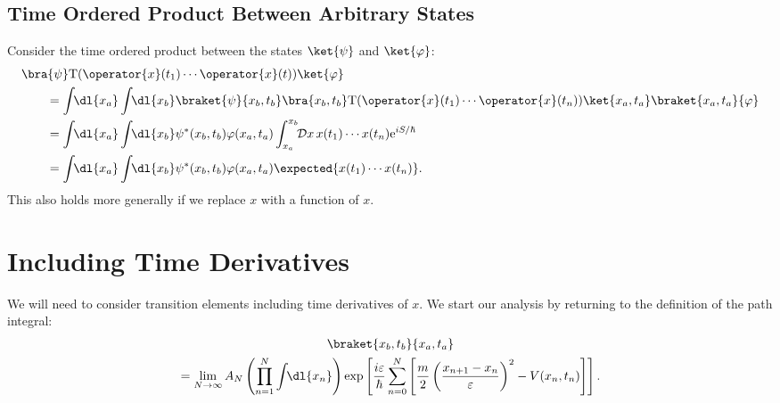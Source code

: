 \documentclass[fleqn]{NotesClass}
\newcommand*{\e}{\mathrm{e}}
\newcommand*{\timeorder}{\mathrm{T}}
\begin{document}
    \subsection{Time Ordered Product Between Arbitrary States}
    Consider the time ordered product between the states \(\ket{\psi}\) and \(\ket{\varphi}\):
    \begin{align}
        &\bra{\psi} \timeorder (\operator{x}(t_1) \dotsm \operator{x}(t)) \ket{\varphi}\\
        &\qquad= \int \!\! \dl{x_a} \int \!\! \dl{x_b} \braket{\psi}{x_b, t_b}\bra{x_b, t_b} \timeorder (\operator{x}(t_1) \dotsm \operator{x}(t_n)) \ket{x_a, t_a} \braket{x_a, t_a}{\varphi}\notag\\
        &\qquad= \int \!\! \dl{x_a} \int \!\! \dl{x_b} \psi^*(x_b, t_b) \varphi(x_a, t_a) \int_{x_a}^{x_b} \!\! \DL{x} \, x(t_1) \dotsm x(t_n) \e^{iS/\hbar}\\
        &\qquad= \int \!\! \dl{x_a} \int \!\! \dl{x_b} \psi^*(x_b, t_b) \varphi(x_a, t_a) \expected{x(t_1) \dotsm x(t_n)}.
    \end{align}
    This also holds more generally if we replace \(x\) with a function of \(x\).
    
    \section{Including Time Derivatives}
    We will need to consider transition elements including time derivatives of \(x\).
    We start our analysis by returning to the definition of the path integral:
    \begin{multline}\label{eqn:definition of path integral}
        \braket{x_b, t_b}{x_a, t_a}\\
        = \lim_{N\to\infty} A_N \left( \prod_{n=1}^{N} \int\!\!\dl{x_n} \right) \exp\left[ \frac{i\varepsilon}{\hbar} \sum_{n=0}^{N} \left[ \frac{m}{2}\left( \frac{x_{n+1} - x_n}{\varepsilon} \right)^2 - V(x_n, t_n) \right] \right].
    \end{multline}
\end{document}
